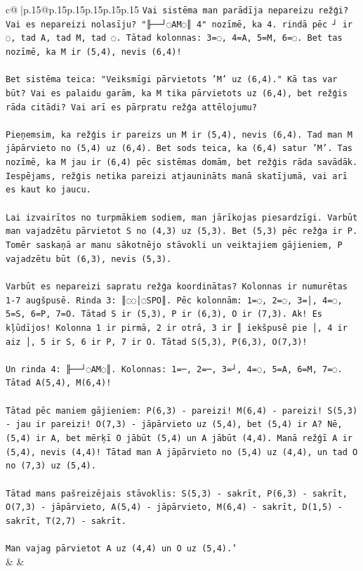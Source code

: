 \documentclass{article}
\begin{document}
{\begin{supertabular}{c@{$\;$}|p{.15\linewidth}@{}p{.15\linewidth}p{.15\linewidth}p{.15\linewidth}p{.15\linewidth}p{.15\linewidth}}
{{{\texttt{Vai sistēma man parādīja nepareizu režģi? Vai es nepareizi nolasīju? "╟──┘◌AM◌║ 4" nozīmē, ka 4. rindā pēc ┘ ir ◌, tad A, tad M, tad ◌. Tātad kolonnas: 3=◌, 4=A, 5=M, 6=◌. Bet tas nozīmē, ka M ir (5,4), nevis (6,4)!} \\
\\ 
\texttt{Bet sistēma teica: "Veiksmīgi pārvietots 'M' uz (6,4)." Kā tas var būt? Vai es palaidu garām, ka M tika pārvietots uz (6,4), bet režģis rāda citādi? Vai arī es pārpratu režģa attēlojumu?} \\
\\ 
\texttt{Pieņemsim, ka režģis ir pareizs un M ir (5,4), nevis (6,4). Tad man M jāpārvieto no (5,4) uz (6,4). Bet sods teica, ka (6,4) satur 'M'. Tas nozīmē, ka M jau ir (6,4) pēc sistēmas domām, bet režģis rāda savādāk. Iespējams, režģis netika pareizi atjaunināts manā skatījumā, vai arī es kaut ko jaucu.} \\
\\ 
\texttt{Lai izvairītos no turpmākiem sodiem, man jārīkojas piesardzīgi. Varbūt man vajadzētu pārvietot S no (4,3) uz (5,3). Bet (5,3) pēc režģa ir P. Tomēr saskaņā ar manu sākotnējo stāvokli un veiktajiem gājieniem, P vajadzētu būt (6,3), nevis (5,3). } \\
\\ 
\texttt{Varbūt es nepareizi sapratu režģa koordinātas? Kolonnas ir numurētas 1{-}7 augšpusē. Rinda 3: ║◌◌│◌SPO║. Pēc kolonnām: 1=◌, 2=◌, 3=│, 4=◌, 5=S, 6=P, 7=O. Tātad S ir (5,3), P ir (6,3), O ir (7,3). Ak! Es kļūdījos! Kolonna 1 ir pirmā, 2 ir otrā, 3 ir ║ iekšpusē pie │, 4 ir aiz │, 5 ir S, 6 ir P, 7 ir O. Tātad S(5,3), P(6,3), O(7,3)!} \\
\\ 
\texttt{Un rinda 4: ╟──┘◌AM◌║. Kolonnas: 1=─, 2=─, 3=┘, 4=◌, 5=A, 6=M, 7=◌. Tātad A(5,4), M(6,4)!} \\
\\ 
\texttt{Tātad pēc maniem gājieniem: P(6,3) {-} pareizi! M(6,4) {-} pareizi! S(5,3) {-} jau ir pareizi! O(7,3) {-} jāpārvieto uz (5,4), bet (5,4) ir A? Nē, (5,4) ir A, bet mērķī O jābūt (5,4) un A jābūt (4,4). Manā režģī A ir (5,4), nevis (4,4)! Tātad man A jāpārvieto no (5,4) uz (4,4), un tad O no (7,3) uz (5,4).} \\
\\ 
\texttt{Tātad mans pašreizējais stāvoklis: S(5,3) {-} sakrīt, P(6,3) {-} sakrīt, O(7,3) {-} jāpārvieto, A(5,4) {-} jāpārvieto, M(6,4) {-} sakrīt, D(1,5) {-} sakrīt, T(2,7) {-} sakrīt.} \\
\\ 
\texttt{Man vajag pārvietot A uz (4,4) un O uz (5,4).'} \\
            }
        }
    }
    & & \\ \\


\end{supertabular}}
\end{document}

